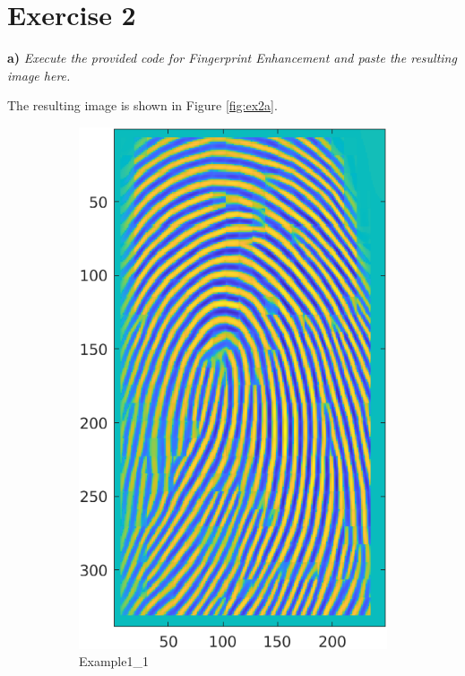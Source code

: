\documentclass[11pt]{article}
\begin{document}
\newpage
\section*{Exercise 2}

\textbf{a) }\emph{Execute the provided code for Fingerprint Enhancement and paste the resulting image here.}

The resulting image is shown in Figure \ref{fig:ex2a}.

\begin{figure}[h!]
  \centering
       \begin{subfigure}[t]{0.45\textwidth}
         \centering
         \includegraphics[scale=0.7]{img/enhanced_1}
         \caption{Example1\_1}
     \end{subfigure}%
     \quad
     \begin{subfigure}[t]{0.45\textwidth}

\end{subfigure}
\end{figure}
\end{document}
